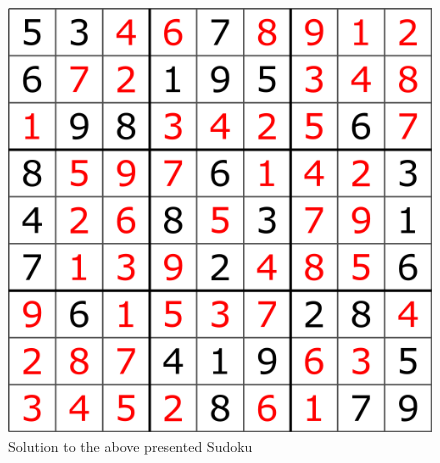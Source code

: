 \begin{figure}[h]
    \centering
    \includegraphics[scale=0.3]{assignment-1/images/sudoku_rules/sudoku-complete.png}
    \caption{Solution to the above presented Sudoku}
    \label{fig:sudoku_complete}
\end{figure}
